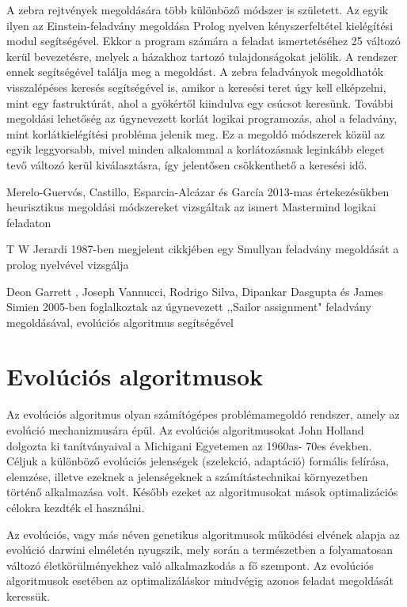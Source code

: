 \documentclass[12pt,a4paper,oneside]{report}
\begin{document}
A zebra rejtvények megoldására több különböző módszer is született. 
Az egyik ilyen az Einstein-feladvány megoldása Prolog nyelven kényszerfeltétel kielégítési modul segítségével.
Ekkor a program számára a feladat ismertetéséhez 25 változó kerül bevezetésre, melyek a házakhoz tartozó tulajdonságokat jelölik. 
A rendszer ennek segítségével találja meg a megoldást.
A zebra feladványok megoldhatók visszalépéses keresés segítségével is, amikor a keresési teret úgy kell elképzelni, mint egy fastruktúrát, ahol a gyökértől kiindulva egy csúcsot keresünk.
További megoldási lehetőség az úgynevezett korlát logikai programozás, ahol a feladvány, mint korlátkielégítési probléma jelenik meg. 
Ez a megoldó módszerek közül az egyik leggyorsabb, mivel minden alkalommal a korlátozásnak leginkább eleget tevő változó kerül kiválasztásra, így jelentősen csökkenthető a keresési idő.

Merelo-Guervós, Castillo, Esparcia-Alcázar és García 2013-mas értekezésükben heurisztikus megoldási módszereket vizsgáltak az ismert Mastermind logikai feladaton\cite{Merelo-Guervos:2013:IES:2463372.2463473}

T W Jerardi	1987-ben megjelent cikkjében egy Smullyan feladvány megoldását a prolog nyelvével vizsgálja\cite{Jerardi:1987:PPL:24714.24722}

Deon Garrett	, Joseph Vannucci, Rodrigo Silva, Dipankar Dasgupta és James Simien 2005-ben foglalkoztak az úgynevezett ,,Sailor assignment" feladvány megoldásával, evolúciós algoritmus segítségével\cite{Garrett:2005:GAS:1068009.1068333}



\chapter{Evolúciós algoritmusok} %

Az evolúciós algoritmus olyan számítógépes problémamegoldó rendszer, amely az evolúció mechanizmusára épül. 
Az evolúciós algoritmusokat John Holland dolgozta ki tanítványaival a Michigani Egyetemen az 1960as- 70es években. 
Céljuk a különböző evolúciós jelenségek (szelekció, adaptáció) formális felírása, elemzése, illetve ezeknek a jelenségeknek a számítástechnikai környezetben történő alkalmazása volt. 
Később ezeket az algoritmusokat mások optimalizációs célokra kezdték el használni.

Az evolúciós, vagy más néven genetikus algoritmusok működési elvének alapja az evolúció darwini elméletén nyugszik, mely során a természetben a folyamatosan változó életkörülményekhez való alkalmazkodás a fő szempont. 
Az evolúciós algoritmusok esetében az optimalizáláskor mindvégig azonos feladat megoldását keressük.
\end{document}
